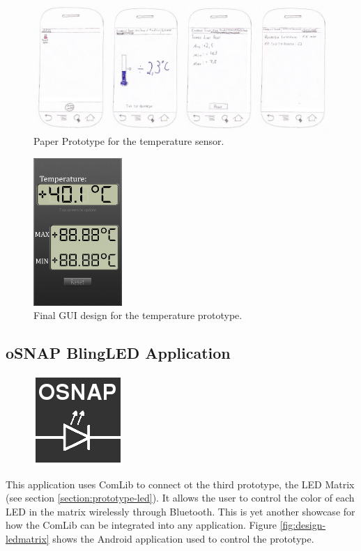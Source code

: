 \begin{figure}[H]
\centering 
\includegraphics[width=1.0\textwidth]{img/prototype2-paper.png}
\caption{Paper Prototype for the temperature sensor.}
\label{fig:prototype2-paper}
\end{figure}

\begin{figure}[H]
\centering 
\includegraphics[width=0.3\textwidth]{img/prototype2-gui.png}
\caption{Final GUI design for the temperature prototype.}
\label{fig:prototype2-gui}
\end{figure}

\subsection{oSNAP BlingLED Application}
\begin{figure}
	\centering \includegraphics[scale=0.25]{img/app-led}
\end{figure}
This application uses ComLib to connect ot the third prototype, the LED Matrix (see section \ref{section:prototype-led}). It allows the user to control the color of each LED in the matrix wirelessly through Bluetooth. This is yet another showcase for how the ComLib can be integrated into any application. Figure \ref{fig:design-ledmatrix} shows the Android application used to control the prototype.

